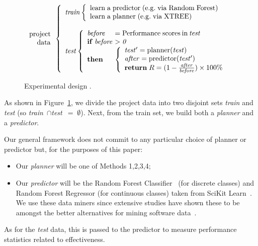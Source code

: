 \documentclass{sig-alternate}
\newcommand{\bi}{\begin{itemize}}
\newcommand{\ei}{\end{itemize}}
\newcommand{\fig}[1]{Figure~\ref{fig:#1}}
\begin{document}
 \begin{figure}[!ht]
{\small 
\[
\begin{array}{r} 
\mathrm{project}\\
\mathrm{data}
\end{array} 
\left\{\begin{array}{l}\mathit{train}
        \left\{\begin{array}{l}
                \mathrm{learn\;a\;}\mathrm{predictor\;}\mathrm{(e.g.\;via \;Random\;Forest)}\\
                \mathrm{learn\;a\;}\mathrm{planner\;}\mathrm{(e.g.\;via \; XTREE)}
              \end{array}\right.
       \\
      ~\\
\mathit{test}  
    \left\{\begin{array}{l@{~}l}
           \mathit{before}& =\mathrm{Performance\; scores \hspace{2pt} in \hspace{2pt}}\mathit{test}\\
           \mathrm{\bf if\;}\mathit{before} & >  \mathit{0}\\
           \mathrm{\bf then} &
           \left\{
            \begin{array}{l}
                \mathit{test'} = \mathrm{planner}(\mathit{test})\\
                \mathit{after} =\mathrm{predictor}(\mathit{test'})\\ 
                \mathrm{{\bf return}\;} R=(1-\frac{\mathit{after}}{\mathit{before}})\times 100 \%
            \end{array}
          \right.
   \end{array}\right.
\end{array} \right. 
\]}
 \caption{Experimental design .}\label{fig:design}
 \end{figure}

As shown in \fig{design}, we divide the
project data  into two disjoint sets {\em train} and {\em test}
(so \mbox{{\em train} $\cap ${\em test} $=\;\emptyset$}).
Next, from the train set, we build both a {\em planner} and
 a {\em  predictor}. 

Our general framework does not   commit to any particular choice of { planner} or { predictor} but, for the purposes of this paper:
\bi
\item Our {\em planner} will be one of Methods 1,2,3,4;
\item Our  {\em predictor} will be the Random Forest Classifier~\cite{Breiman2001} (for discrete classes) and Random Forest Regressor (for continuous classes) taken from  SciKit Learn~\cite{Pedregosa2012}.   We use these
data miners since extensive studies have shown these to be amongst the better alternatives for mining software data~\cite{lessmann}.
\ei
As for the {\em test} data, this is passed to the { predictor}
to measure performance statistics related to effectiveness. 
\end{document}
